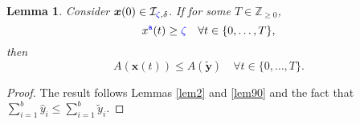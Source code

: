 \documentclass[10 pt,twocolumn,journal]{IEEEtran}
\theoremstyle{plain}
\newtheorem{lemma}{Lemma}
\newcommand{\I}{\mathcal{I}}
\newcommand{\x}{\bm{x}}
\newcommand{\y}{\bm{y}}
\renewcommand{\r}{\tb{\zeta}}
\renewcommand{\d}{{\delta}}
\newcommand{\n}{\tb{\mathtt{a}}}
\newcommand{\tb}{\textcolor{blue}}
\theoremstyle{definition}
\begin{document}
%
\begin{lemma} \label{lem9} 
    Consider $\x(0) \in \I_{\r,\d}$.
    If for some $T\in\mathbb{Z}_{\geq0}$,  
    \begin{equation}   \label{lem9-eq01}
        x^{\n}(t) \geq \r \quad \forall t\in\{0,\ldots, T\},
    \end{equation}
    then 
    \begin{equation} \label{lem9-eq02}
         A(\x(t))
         \leq A(\tilde{\y})\quad \forall t\in\{0,\ldots, T\}.
    \end{equation}
\end{lemma}
\begin{proof}
    The result follows Lemmas \ref{lem2} and \ref{lem90} and the fact that $ \sum_{i=1}^b\hat{y}_i \leq  \sum_{i=1}^b\tilde{y}_i$.
\end{proof}
\end{document}
